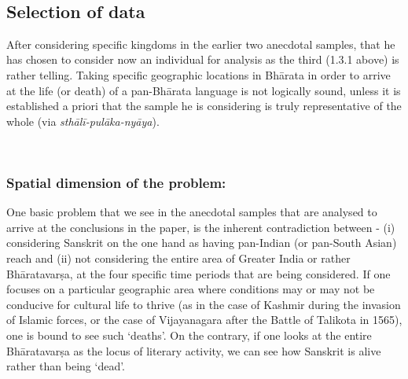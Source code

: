 ~\\[-20pt]

\subsection{Selection of data}

After considering specific kingdoms in the earlier two anecdotal samples, that he has chosen to consider now an individual for analysis as the third (1.3.1 above) is rather telling. Taking specific geographic locations in Bhārata in order to arrive at the life (or death) of a pan-Bhārata language is not logically sound, unless it is established a priori that the sample he is considering is truly representative of the whole (via {\sl sthālī-pulāka-nyāya}). 

~\\[-40pt]

\subsubsection{Spatial dimension of the problem:}
\vskip -5pt

One basic problem that we see in the anecdotal samples that are analysed to arrive at the conclusions in the paper, is the inherent contradiction between - (i) considering Sanskrit on the one hand as having pan-Indian (or pan-South Asian) reach and (ii) not considering the entire area of Greater India or rather Bhāratavarṣa, at the four specific time periods that are being considered. If one focuses on a particular geographic area where conditions may or may not be conducive for cultural life to thrive (as in the case of Kashmir during the invasion of Islamic forces, or the case of Vijayanagara after the Battle of Talikota in 1565), one is bound to see such ‘deaths’. On the contrary, if one looks at the entire Bhāratavarṣa as the locus of literary activity, we can see how Sanskrit is alive rather than being ‘dead’. 

